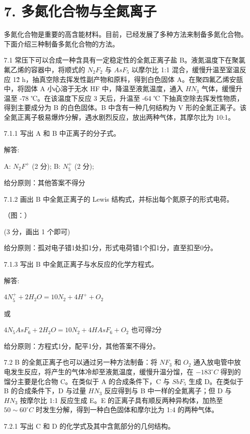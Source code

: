 \section*{7. 多氮化合物与全氮离子}
多氮化合物是重要的高含能材料。目前，已经发展了多种方法来制备多氮化合物。下面介绍三种制备多氮化合物的方法。

7.1 常压下可以合成一种含具有一定稳定性的全氮正离子盐 B。液氮温度下在聚氯氟乙烯的容器中，将顺式的 $N_{2}F_{2}$ 与 $AsF_{5}$ 以摩尔比 1:1 混合，缓慢升温至室温反应 1\~2 h，抽真空除去挥发性副产物和原料，得到白色固体 A。在聚四氟乙烯安瓿中，将固体 A 小心溶于无水 HF 中，降温至液氮温度，通入 $HN_{3}$ 气体，缓慢升温至 -78 ℃。在该温度下反应 3 天后，升温至 -64 ℃ 下抽真空除去挥发性物质，得到主要成分为 B 的白色固体。B 中含有一种几何结构为 V 形的全氮正离子。该全氮正离子极易爆炸分解，遇水剧烈反应，放出两种气体，其摩尔比为 10:1。

7.1.1 写出 A 和 B 中正离子的分子式。

解答:

A: $N_{2}F^{+}$ (2 分); B: $N_{5}^{+}$ (2 分);

给分原则：其他答案不得分

7.1.2 画出 B 中全氮正离子的 Lewis 结构式，并标出每个氮原子的形式电荷。

（图：）

(3 分，画出 1 个即可)

给分原则：孤对电子错1处扣1分，形式电荷错1个扣1分，直至扣至0分。

7.1.3 写出 B 中全氮正离子与水反应的化学方程式。

解答:

$4N_{5}^{+} + 2H_{2}O = 10N_{2} + 4H^{+} + O_{2}$

或

$4N_{5}AsF_{6}+2H_{2}O=10N_{2}+4HAsF_{6}+O_{2}$ 也可得2分

给分原则：方程式1分，配平1分，其他答案不得分。

7.2 B 的全氮正离子也可以通过另一种方法制备：将 $NF_{3}$ 和 $O_{2}$ 通入放电管中放电发生反应，将产生的气体冷却至液氮温度，缓慢升温分馏，在 $-183^{\circ}C$ 得到的馏分主要是化合物 C。在类似于 A 的合成条件下，C 与 $SbF_{5}$ 生成 D。在类似于 B 的合成条件下，D 与过量 $HN_{3}$ 反应得到与 B 中一样的全氮离子；但 D 与 $HN_{3}$ 按摩尔比 1:1 反应生成 E。E 的正离子具有顺反两种异构体，加热至 $50 \sim 60^{\circ}C$ 时发生分解，得到一种白色固体和摩尔比为 1:4 的两种气体。

7.2.1 写出 C 和 D 的化学式及其中含氮部分的几何结构。

